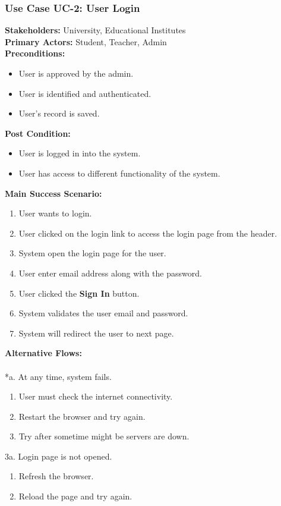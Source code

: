 \documentclass[12pt]{article}
\begin{document}
\subsubsection{Use Case UC-2: User Login}
\textbf{Stakeholders: } University, Educational Institutes \\
\textbf{Primary Actors: } Student, Teacher, Admin \\
\textbf{Preconditions: }
\begin{itemize}
\item User is approved by the admin.
\item User is identified and authenticated.
\item User's record is saved.
\end{itemize}
\textbf{Post Condition: }
\begin{itemize}
\item User is logged in into the system.
\item User has access to different functionality of the system.
\end{itemize}
\newpage
\textbf{Main Success Scenario:}
\begin{enumerate}
\item User wants to login.
\item User clicked on the login link to access the login page from the header.
\item System open the login page for the user.
\item User enter email address along with the password.
\item User clicked the \textbf{Sign In} button.
\item System validates the user email and password.
\item System will redirect the user to next page.
\end{enumerate}
\textbf{Alternative Flows:}\\
\\
*a. At any time, system fails.
\begin{enumerate}
\item User must check the internet connectivity.
\item Restart the browser and try again.
\item Try after sometime might be servers are down.
\end{enumerate}
3a. Login page is not opened.
\begin{enumerate}
\item Refresh the browser.
\item Reload the page and try again.
\end{enumerate}
\end{document}

